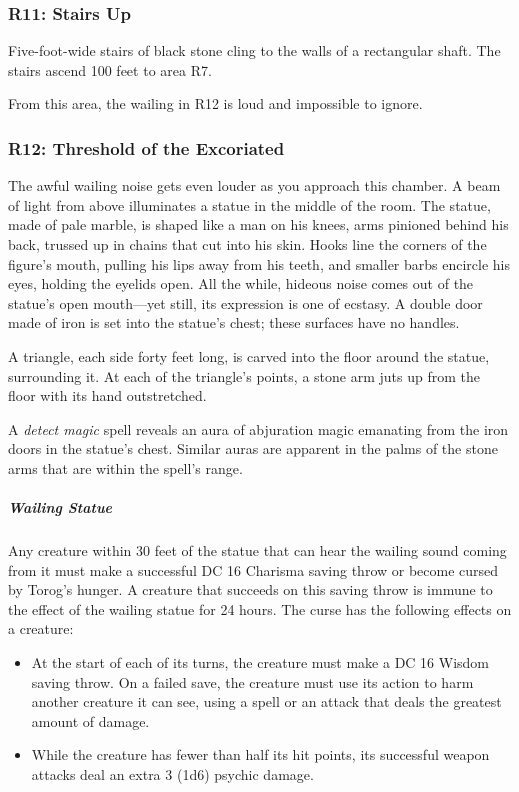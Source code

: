 \documentclass[10pt,a4paper,twoside,fancy,bg=print,twocolumn,openany,nodeprecatedcode]{dndbook}
\begin{document}
\subsubsection{R11: Stairs Up}
Five-foot-wide stairs of black stone cling to the walls of a rectangular shaft. The stairs ascend 100 feet to area R7.

From this area, the wailing in R12 is loud and impossible to ignore.

\subsubsection{R12: Threshold of the Excoriated}
\begin{DndReadAloud}{}
The awful wailing noise gets even louder as you approach this chamber. A beam of light from above illuminates a statue in the middle of the room. The statue, made of pale marble, is shaped like a man on his knees, arms pinioned behind his back, trussed up in chains that cut into his skin. Hooks line the corners of the figure's mouth, pulling his lips away from his teeth, and smaller barbs encircle his eyes, holding the eyelids open. All the while, hideous noise comes out of the statue's open mouth—yet still, its expression is one of ecstasy. A double door made of iron is set into the statue's chest; these surfaces have no handles.

A triangle, each side forty feet long, is carved into the floor around the statue, surrounding it. At each of the triangle's points, a stone arm juts up from the floor with its hand outstretched.

\end{DndReadAloud}

A \textit{detect magic} spell reveals an aura of abjuration magic emanating from the iron doors in the statue's chest. Similar auras are apparent in the palms of the stone arms that are within the spell's range.

\subparagraph{Wailing Statue}
Any creature within 30 feet of the statue that can hear the wailing sound coming from it must make a successful DC 16 Charisma saving throw or become cursed by Torog's hunger. A creature that succeeds on this saving throw is immune to the effect of the wailing statue for 24 hours. The curse has the following effects on a creature:


\begin{itemize}
\item At the start of each of its turns, the creature must make a DC 16 Wisdom saving throw. On a failed save, the creature must use its action to harm another creature it can see, using a spell or an attack that deals the greatest amount of damage.
\item While the creature has fewer than half its hit points, its successful weapon attacks deal an extra 3 (1d6) psychic damage.
\end{itemize}
\end{document}
